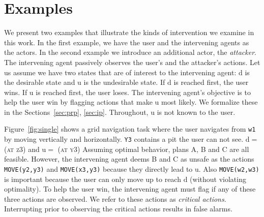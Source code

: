 \documentclass[letterpaper]{article}
\theoremstyle{plain}
\begin{document}
\section{Examples}
\label{sec:example}

We present two examples that illustrate the kinds of intervention we examine in this work. In the first example, we have the user and the intervening agents as the actors. In the second example we introduce an additional actor, the \textit{attacker}. The intervening agent passively observes the user's and the attacker's actions. Let us assume we have two states that are of interest to the intervening agent: $\mathrm{d}$ is the desirable state and $\mathrm{u}$ is the undesirable state. If $\mathrm{d}$ is reached first, the user wins. If $\mathrm{u}$ is reached first, the user loses. The intervening agent's objective is to help the user win by flagging actions that make $\mathrm{u}$ most likely. We formalize these in the Sections~\ref{sec:prp}, \ref{sec:ip}. Throughout, $\mathrm{u}$ is not known to the user.

Figure~\ref{fig:single} shows a grid navigation task where the user navigates from \texttt{w1} by moving vertically and horizontally. \texttt{Y3} contains a pit the user can not see. $\mathrm{d}=$ \textsc{(at z3)} and $\mathrm{u}=$ \textsc{(at y3})
Assuming optimal behavior, plans A, B and C are all feasible. 
However, the intervening agent deems B and C as unsafe as the actions \texttt{MOVE(y2,y3)} and \texttt{MOVE(x3,y3)} because they directly lead to $\mathrm{u}$. Also \texttt{MOVE(w2,w3)} is important because the user can only move up to reach $\mathrm{d}$ (without violating optimality). To help the user win, the intervening agent must flag if any of these three actions are observed. We refer to these actions as \textit{critical actions}. Interrupting prior to observing the critical actions results in false alarms.
\end{document}
